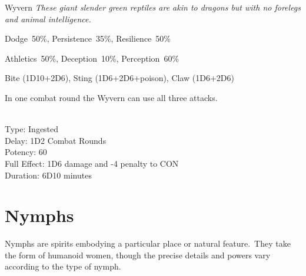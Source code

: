 \begin{monsterbox}{Wyvern}
	\textit{These giant slender green reptiles are akin to dragons but with no forelegs and animal intelligence.}\\
	\rpghline
	\basics[%
        hitpoints  = 23, 
	majorwound = 12,
	damagemodifier = +2D6,
	powerpoints = 10,
	movementrate = {23m, 30m when flying},
	armor = Scales (5AP),
	plunderrating = 1
	]
	\rpghline%
	\stats[ %
		STR = 4D6+12 (26),
		CON = 2D6+12 (19),
		DEX = 2D6+6  (13),
		SIZ = 4D6+12 (26),
		INT = 7      (7),
		POW = 3D6    (11),
		CHA = 6      (6)
	]
	\rpghline%
	\begin{rpg-monsteraction}[Resistances]
		Dodge~50\%, Persistence~35\%, Resilience~50\%
	\end{rpg-monsteraction}
	\begin{rpg-monsteraction}[Practical]
		Athletics~50\%, Deception~10\%, Perception~60\%
	\end{rpg-monsteraction}
	\begin{rpg-monsteraction}
		Bite (1D10+2D6), Sting (1D6+2D6+poison), Claw (1D6+2D6)
	\end{rpg-monsteraction}
	\begin{rpg-monsteraction}
		In one combat round the Wyvern can use all three attacks.	
	\end{rpg-monsteraction}
	\begin{rpg-monsteraction}
		\\Type: Ingested\\
		Delay: 1D2 Combat Rounds\\
                Potency: 60\\
		Full Effect: 1D6 damage and -4 penalty to CON\\
		Duration: 6D10 minutes
	\end{rpg-monsteraction}

\end{monsterbox}

\clearpage


\section{Nymphs}
Nymphs are spirits embodying a particular place or natural feature. They take the form of humanoid women, though the precise details and powers vary according to the type of nymph.


